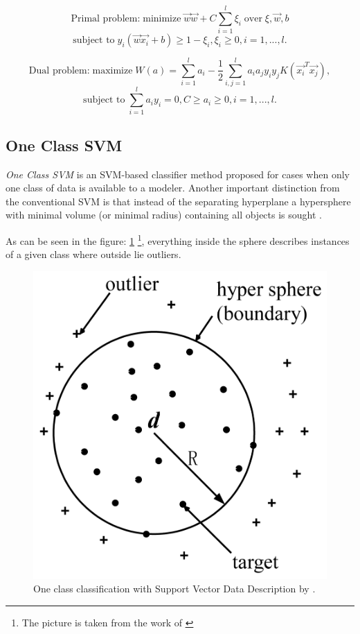 \[\textrm{Primal problem:}\; \textrm{minimize}\; \vec{w} \vec{w} + C \sum_{i=1}^{l} \xi_i\; \textrm{over}\; \xi,\vec{w},b\] 
\[\textrm{subject to}\; y_i(\vec{w}\vec{x_i} + b) \geq 1 - \xi_i,\xi_i \geq 0, i = 1, ...,l.\] 

\[\textrm{Dual problem:}\; \textrm{maximize}\; W(a) =  \sum_{i=1}^{l} a_i - \frac{1}{2}\sum_{i,j = 1}^{l}a_i a_j y_i y_j K(\vec{x_i}^T \vec{x_j}) , \]
\[\textrm{subject to}\; \sum_{i=1}^{l}a_i y_i = 0,C \geq a_i \geq 0, i = 1,...,l.\] 

\subsection{One Class SVM}\label{Chapter:OC-SVM}
\textit{One Class SVM} is an SVM-based classifier method proposed for cases when only one class of data is available to a modeler. Another important distinction from the conventional SVM is that instead of the separating hyperplane a hypersphere with minimal volume (or
minimal radius) containing all objects is sought \cite{Tax:2004:SVD:960091.960109}. 

As can be seen in the figure: \ref{fig:hypersphere} \footnote{The picture is taken from the work of  \cite{s120810109}}, everything inside the sphere describes instances of a given class where outside lie outliers. 

\begin{figure}[h!]
    \centering
    \includegraphics[scale=0.2]{Graphics/tax-duin-svm.png}
    \caption{One class classification with Support Vector Data Description by \cite{Tax:2004:SVD:960091.960109}.}
    \label{fig:hypersphere}
\end{figure}

